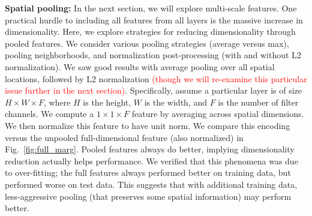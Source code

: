 \documentclass[10pt,twocolumn,letterpaper]{article}
\newcommand{\deva}[1]{\textcolor{blue}{[Deva: #1]}}
\newcommand{\new}[1]{\textcolor{red}{#1}}
\newcommand{\songfan}[1]{\textcolor{blue}{[Songfan: #1]}}
\begin{document}
{\bf Spatial pooling:} In the next section, we will explore multi-scale features. One practical hurdle to including all features from all layers is the massive increase in dimensionality. Here, we explore strategies for reducing dimensionality through pooled features. We consider various pooling strategies (average versus max), pooling neighborhoods, and normalization post-processing (with and without L2 normalization). We saw good results with average pooling over all spatial locations, followed by L2 normalization \new{(though we will re-examine this particular issue further in the next section)}. Specifically, assume a particular layer is of size $H \times W \times F$, where $H$ is the height, $W$ is the width, and $F$ is the number of filter channels. We compute a $1 \times 1 \times F$ feature by averaging across spatial dimensions. We then normalize this feature to have unit norm. %
We compare this encoding versus the unpooled full-dimensional feature (also normalized) in Fig.~\ref{fig:full_marg}. Pooled features always do better, implying dimensionality reduction actually helps performance. We verified that this phenomena was due to over-fitting; the full features always performed better on training data, but performed worse on test data. This suggests that with additional training data, less-aggressive pooling (that preserves some spatial information) may perform better. %
\end{document}
